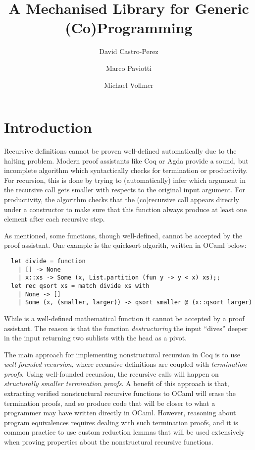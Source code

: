 \documentclass[anonymous, a4paper, UKenglish, cleveref, autoref, thm-restate]{lipics-v2021}
\title{A Mechanised Library for Generic (Co)Programming}
\author{David Castro-Perez}{School of Computing, University of Kent}{d-castro-perez@kent.ac.uk}{}{}
\author{Marco Paviotti}{School of Computing, University of Kent}{m.paviotti@kent.ac.uk}{}{}
\author{Michael Vollmer}{School of Computing, University of Kent}{m.vollmer@kent.ac.uk}{}{}
\begin{document}
\maketitle

\begin{abstract}

\end{abstract}

\section{Introduction}
\label{sec:intro}
Recursive definitions cannot be proven well-defined automatically due to the
halting problem. Modern proof assistants like Coq or Agda provide a sound, but
incomplete algorithm which syntactically checks for termination or
productivity.  For recursion, this is done by trying to (automatically) infer
which argument in the recursive call gets smaller with respects to the original
input argument.  For productivity, the algorithm checks that the (co)recursive
call appears directly under a constructor to make sure that this function
always produce at least one element after each recursive step.

As mentioned, some functions, though well-defined, cannot be accepted by the
proof assistant. One example is the quicksort algorith, written in OCaml below:
\begin{verbatim}
  let divide = function
    | [] -> None
    | x::xs -> Some (x, List.partition (fun y -> y < x) xs);;
  let rec qsort xs = match divide xs with
    | None -> []
    | Some (x, (smaller, larger)) -> qsort smaller @ (x::qsort larger)
\end{verbatim}
While  is a well-defined mathematical function it cannot be
accepted by a proof assistant.  The reason is that the 
function \emph{destructuring} the input ``dives'' deeper in the input returning
two sublists with the head as a pivot.

The main approach for implementing nonstructural recursion in Coq is to use
\emph{well-founded recursion}, where recursive definitions are coupled with
\emph{termination proofs}. Using well-founded recursion, the recursive calls
will happen on \emph{structurally smaller termination proofs}. A benefit of
this approach is that, extracting verified nonstructural recursive functions to
OCaml will erase the termination proofs, and so produce code that will be
closer to what a programmer may have written directly in OCaml. However,
reasoning about program equivalences requires dealing with such termination
proofs, and it is common practice to use custom reduction lemmas that will be
used extensively when proving properties  about the nonstructural recursive
functions.
\end{document}
